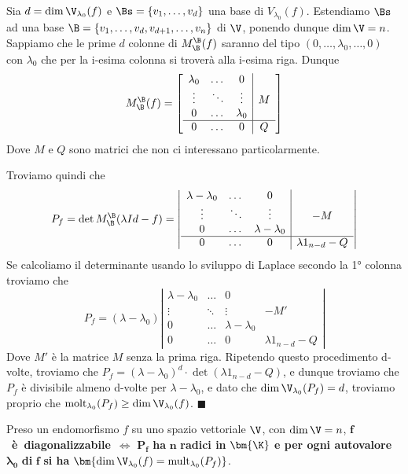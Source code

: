 \documentclass[11pt, a4paper, titlepage, oneside]{scrbook}
\begin{document}
\Dimostrazione \nopagebreak

Sia $d = \dim \V_{\lambda_0}(f)$ e $\Bs = \{v_1, \ldots, v_d\}$ una base di $V_{\lambda_0}(f)$. Estendiamo $\Bs$ ad una base $\B = \{v_1, \ldots, v_d, v_{d+1}, \ldots, v_n\}$ di $\V$, ponendo dunque $\dim \V = n$. Sappiamo che le prime $d$ colonne di $M_\B^\B(f)$ saranno del tipo $(0,\ldots, \lambda_0, \ldots, 0)$ con $\lambda_0$ che per la i-esima colonna si troverà alla i-esima riga. Dunque
\[
M_\B^\B(f) = \left[
\begin{array}{ccc|c}
    \lambda_0 & \dots & 0 &\\
    \vdots & \ddots & \vdots & M \\
    0 & \dots & \lambda_0 & \\ \hline
    0 & \dots & 0 & Q
\end{array}
\right]
\]
Dove $M$ e $Q$ sono matrici che non ci interessano particolarmente. 

Troviamo quindi che 
\[
P_f = \det M_\B^\B(\lambda Id - f) = \left|
\begin{array}{ccc|c}
    \lambda - \lambda_0 & \dots & 0 & \\
    \vdots & \ddots & \vdots & -M \\
    0 & \dots & \lambda - \lambda_0 & \\ \hline
    0 & \dots & 0 & \lambda 1_{n-d}  - Q 
\end{array}
\right|
\]
Se calcoliamo il determinante usando lo sviluppo di Laplace secondo la 1° colonna troviamo che
\[
P_f = (\lambda - \lambda_0) \left|
\begin{array}{ccc|c}
    \lambda - \lambda_0 & \dots & 0 & \\
    \vdots & \ddots & \vdots & -M' \\
    0 & \dots & \lambda - \lambda_0 & \\ \hline
    0 & \dots & 0 & \lambda 1_{n-d}  - Q 
\end{array}
\right|
\]
Dove $M'$ è la matrice $M$ senza la prima riga. Ripetendo questo procedimento d-volte, troviamo che $P_f = (\lambda - \lambda_0)^d \cdot \det(\lambda 1_{n-d} - Q)$, e dunque troviamo che $P_f$ è divisibile almeno d-volte per $\lambda - \lambda_0$, e dato che $\dim \V_{\lambda_0}(P_f) = d$, troviamo proprio che \mbox{$\mathrm{molt}_{\lambda_0}(P_f) \geq \dim \V_{\lambda_0}(f)$}. $\blacksquare$

\begin{Proposizione}[Corollario]
\label{corollario-f diagonalizzabile Pf radici}
Preso un endomorfismo $f$ su uno spazio vettoriale $\V$, con $\dim \V = n$, \mbox{$\bm{f}$ \textbf{è diagonalizzabile} $\iff$} $\bm{P_f}$ \textbf{ha} $\bm{n}$ \textbf{radici in} $\bm{\K}$ \textbf{e per ogni autovalore} $\bm{\lambda_0}$ \textbf{di} $\bm{f}$ \textbf{si ha} $\bm{\dim \V_{\lambda_0}(f) = \mathrm{mult}_{\lambda_0}(P_f)}$.
\end{Proposizione}
\end{document}
